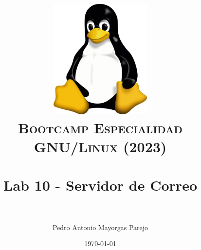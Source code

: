 

\graphicspath{ {img/} }

\title{
\normalfont \normalsize
\includegraphics[width=6cm,height=6cm]{logo}\\
\textsc{\textbf{Bootcamp Especialidad GNU/Linux (2023)}} \\ [25pt] %
\horrule{0.5pt} \\[0.4cm] %
\huge Lab 10 - Servidor de Correo \\ %
\horrule{2pt} \\[0.5cm] %
}


\author{Pedro Antonio Mayorgas Parejo} %

\date{\normalsize\today} %




\maketitle %

\newpage %

\tableofcontents %

\newpage


